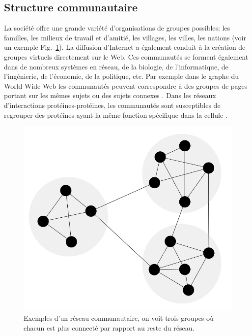 \subsection{Structure communautaire}
La société offre une grande variété d'organisations de groupes possibles: les familles, les milieux de travail et d'amitié, les villages, les villes, les nations (voir un exemple Fig.~\ref{community-network}). La diffusion d'Internet a également conduit à la création de groupes virtuels directement sur le Web. Ces communautés se forment également dans de nombreux systèmes en réseau, de la biologie, de l'informatique, de l'ingénierie, de l'économie, de la politique, etc. Par exemple dans le graphe du World Wide Web les communautés peuvent correspondre à des groupes de pages portant sur les mêmes sujets ou des sujets connexes \cite{Dou-al2007,Flak-al2002}. Dans les réseaux d'interactions protéines-protéines, les communautés sont susceptibles de regrouper des protéines ayant la même fonction spécifique dans la cellule \cite{ChY2006,RivT2003}.\\

\begin{figure}[h!]
	\centering
	\includegraphics[scale=0.25]{./figures/Network-Community-structure2}
	\caption{Exemples d'un réseau communautaire, on voit trois groupes où chacun est plus connecté par rapport au reste du réseau.}
	\label{community-network}
\end{figure}

